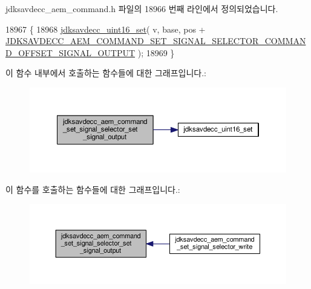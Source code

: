 jdksavdecc\+\_\+aem\+\_\+command.\+h 파일의 18966 번째 라인에서 정의되었습니다.


\begin{DoxyCode}
18967 \{
18968     \hyperlink{group__endian_ga14b9eeadc05f94334096c127c955a60b}{jdksavdecc\_uint16\_set}( v, base, pos + 
      \hyperlink{group__command__set__signal__selector_ga7c95a215ae574070ed11b812779f2cbb}{JDKSAVDECC\_AEM\_COMMAND\_SET\_SIGNAL\_SELECTOR\_COMMAND\_OFFSET\_SIGNAL\_OUTPUT}
       );
18969 \}
\end{DoxyCode}


이 함수 내부에서 호출하는 함수들에 대한 그래프입니다.\+:
\nopagebreak
\begin{figure}[H]
\begin{center}
\leavevmode
\includegraphics[width=350pt]{group__command__set__signal__selector_ga01401925e00059c2e887c86ee75a0937_cgraph}
\end{center}
\end{figure}




이 함수를 호출하는 함수들에 대한 그래프입니다.\+:
\nopagebreak
\begin{figure}[H]
\begin{center}
\leavevmode
\includegraphics[width=350pt]{group__command__set__signal__selector_ga01401925e00059c2e887c86ee75a0937_icgraph}
\end{center}
\end{figure}


